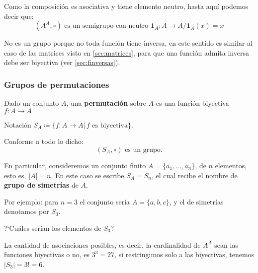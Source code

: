 Como la composición es asociativa y tiene elemento neutro, hasta aquí podemos decir que:
\[ (A^A, \circ) \mbox{ es un semigrupo con neutro } \mathbf{1}_A: A \rightarrow A /  \mathbf{1}_A(x) = x \]

No es un grupo porque no toda función tiene inversa, en este sentido es similar al caso de las matrices visto en \ref{sec:matrices}, para que una función admita inversa debe ser biyectiva (ver \ref{sec:finversas}). 

\subsubsection{Grupos de permutaciones}

\begin{fmd-definition}[Permutación]
	Dado un conjunto $A$, una \textbf{permutación} sobre $A$ es una función biyectiva $f: A \rightarrow A$
\end{fmd-definition}

Notación $S_A \coloneqq \{ f: A \rightarrow A | \, f \mbox{ es biyectiva}\}$.

Conforme a todo lo dicho:
\[ (S_A, \circ ) \mbox{ es un grupo.}\]

En particular, consideremos un conjunto finito $A = \{ a_1, \dots, a_n \}$, de $n$ elementos, esto es, $|A| = n$. En este caso se escribe $S_A = S_n$, el cual recibe el nombre de \textbf{grupo de simetrías} de $A$.

Por ejemplo: para $n = 3$ el conjunto sería $A = \{a, b, c\}$, y el de simetrías denotamos por $S_3$.

?`Cuáles serían los elementos de $S_3$?

La cantidad de asociaciones posibles, es decir, la cardinalidad de $A^A$ sean las funciones biyectivas o no, es $3^3 = 27$, si restringimos solo a las biyectivas, tenemos $|S_3| = 3! = 6$.

